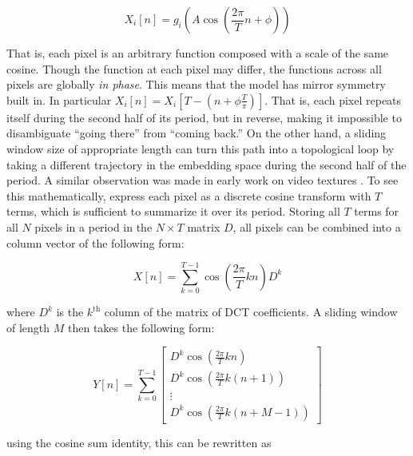 \documentclass[a4paper,UKenglish]{lipics-v2016}
\begin{document}
\begin{equation}
X_i[n] = g_i \left( A \cos \left( \frac{2 \pi}{T} n + \phi \right) \right)
\end{equation}

That is, each pixel is an arbitrary function composed with a scale of the same cosine.  Though the function at each pixel may differ, the functions across all pixels are globally {\em in phase}.  This means that the model has mirror symmetry built in.  In particular $X_i[n] = X_i\left[ T - \left(n + \phi \frac{T}{\pi} \right) \right]$.  That is, each pixel repeats itself during the second half of its period, but in reverse, making it impossible to disambiguate ``going there'' from ``coming back.''  On the other hand, a sliding window size of appropriate length can turn this path into a topological loop by taking a different trajectory in the embedding space during the second half of the period.  A similar observation was made in early work on video textures \cite{schodl2000video}.  To see this mathematically, express each pixel as a discrete cosine transform with $T$ terms, which is sufficient to summarize it over its period.  Storing all $T$ terms for all $N$ pixels in a period in the $N \times T$ matrix $D$,  all pixels can be combined into a column vector of the following form:



\begin{equation}
\label{eq:rawexpansion}
X[n] = \sum_{k = 0}^{T-1} \cos \left( \frac{2 \pi}{T} k n \right) D^k
\end{equation}

where $D^k$ is the $k^{\text{th}}$ column of the matrix of DCT coefficients.  A sliding window of length $M$ then takes the following form:

\begin{equation}
Y[n] = \sum_{k = 0}^{T-1} \left[ \begin{array}{c} D^k \cos \left( \frac{2 \pi}{T} k n \right)  \\ D^k \cos \left( \frac{2 \pi}{T} k (n+1) \right) \\  \vdots \\ D^k \cos \left( \frac{2 \pi}{T} k (n+M-1) \right) \end{array} \right] 
\end{equation}


using the cosine sum identity, this can be rewritten as
\end{document}

